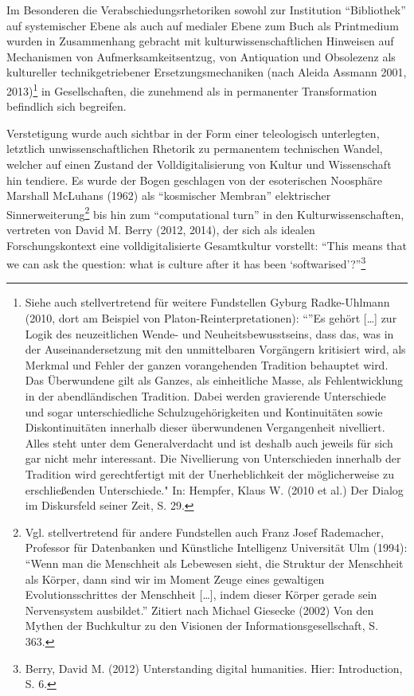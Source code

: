 \documentclass[a4paper,
fontsize=11pt,
oneside,
numbers=noperiodatend,
parskip=half-,
bibliography=totoc,
final
]{scrartcl}
\begin{document}
Im Besonderen die Verabschiedungsrhetoriken sowohl zur Institution
\enquote{Bibliothek} auf systemischer Ebene als auch auf medialer Ebene
zum Buch als Printmedium wurden in Zusammenhang gebracht mit
kulturwissenschaftlichen Hinweisen auf Mechanismen von
Aufmerksamkeitsentzug, von Antiquation und Obsolezenz als kultureller
technikgetriebener Ersetzungsmechaniken (nach Aleida Assmann 2001,
2013)\footnote{Siehe auch stellvertretend für weitere Fundstellen Gyburg
  Radke-Uhlmann (2010, dort am Beispiel von Platon-Reinterpretationen):
  \enquote{}Es gehört {[}\ldots{}{]} zur Logik des neuzeitlichen Wende-
  und Neuheitsbewusstseins, dass das, was in der Auseinandersetzung mit
  den unmittelbaren Vorgängern kritisiert wird, als Merkmal und Fehler
  der ganzen vorangehenden Tradition behauptet wird. Das Überwundene
  gilt als Ganzes, als einheitliche Masse, als Fehlentwicklung in der
  abendländischen Tradition. Dabei werden gravierende Unterschiede und
  sogar unterschiedliche Schulzugehörigkeiten und Kontinuitäten sowie
  Diskontinuitäten innerhalb dieser überwundenen Vergangenheit
  nivelliert. Alles steht unter dem Generalverdacht und ist deshalb auch
  jeweils für sich gar nicht mehr interessant. Die Nivellierung von
  Unterschieden innerhalb der Tradition wird gerechtfertigt mit der
  Unerheblichkeit der möglicherweise zu erschließenden Unterschiede."
  In: Hempfer, Klaus W. (2010 et al.) Der Dialog im Diskursfeld seiner
  Zeit, S. 29.} in Gesellschaften, die zunehmend als in permanenter
Transformation befindlich sich begreifen.

Verstetigung wurde auch sichtbar in der Form einer teleologisch
unterlegten, letztlich unwissenschaftlichen Rhetorik zu permanentem
technischen Wandel, welcher auf einen Zustand der Volldigitalisierung
von Kultur und Wissenschaft hin tendiere. Es wurde der Bogen geschlagen
von der esoterischen Noosphäre Marshall McLuhans (1962) als
\enquote{kosmischer Membran} elektrischer Sinnerweiterung\footnote{Vgl.
  stellvertretend für andere Fundstellen auch Franz Josef Rademacher,
  Professor für Datenbanken und Künstliche Intelligenz Universität Ulm
  (1994): \enquote{Wenn man die Menschheit als Lebewesen sieht, die
  Struktur der Menschheit als Körper, dann sind wir im Moment Zeuge
  eines gewaltigen Evolutionsschrittes der Menschheit {[}\ldots{}{]},
  indem dieser Körper gerade sein Nervensystem ausbildet.} Zitiert nach
  Michael Giesecke (2002) Von den Mythen der Buchkultur zu den Visionen
  der Informationsgesellschaft, S. 363.} bis hin zum
\enquote{computational turn} in den Kulturwissenschaften, vertreten von
David M. Berry (2012, 2014), der sich als idealen Forschungskontext eine
volldigitalisierte Gesamtkultur vorstellt: \enquote{This means that we
can ask the question: what is culture after it has been
\enquote{softwarised}?}\footnote{Berry, David M. (2012) Unterstanding
  digital humanities. Hier: Introduction, S. 6.}
\end{document}
